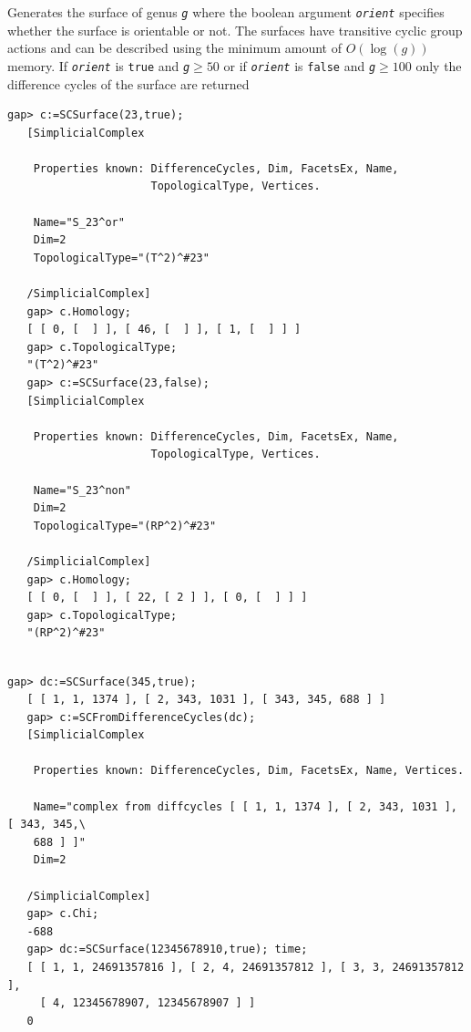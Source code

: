\documentclass[a4paper,11pt]{report}
\begin{document}
{{{ Generates the surface of genus \mbox{\texttt{\mdseries\slshape g}} where the boolean argument \mbox{\texttt{\mdseries\slshape orient}} specifies whether the surface is orientable or not. The surfaces have
transitive cyclic group actions and can be described using the minimum amount
of $O(\operatorname{log} (g))$ memory. If \mbox{\texttt{\mdseries\slshape orient}} is \texttt{true} and \mbox{\texttt{\mdseries\slshape g}}$ \geq 50$ or if \mbox{\texttt{\mdseries\slshape orient}} is \texttt{false} and \mbox{\texttt{\mdseries\slshape g}}$ \geq 100$ only the difference cycles of the surface are returned 
\begin{Verbatim}[commandchars=!@|,fontsize=\small,frame=single,label=Example]
   gap> c:=SCSurface(23,true); 
   [SimplicialComplex
   
    Properties known: DifferenceCycles, Dim, FacetsEx, Name, 
                      TopologicalType, Vertices.
   
    Name="S_23^or"
    Dim=2
    TopologicalType="(T^2)^#23"
   
   /SimplicialComplex]
   gap> c.Homology;
   [ [ 0, [  ] ], [ 46, [  ] ], [ 1, [  ] ] ]
   gap> c.TopologicalType;
   "(T^2)^#23"
   gap> c:=SCSurface(23,false); 
   [SimplicialComplex
   
    Properties known: DifferenceCycles, Dim, FacetsEx, Name, 
                      TopologicalType, Vertices.
   
    Name="S_23^non"
    Dim=2
    TopologicalType="(RP^2)^#23"
   
   /SimplicialComplex]
   gap> c.Homology;
   [ [ 0, [  ] ], [ 22, [ 2 ] ], [ 0, [  ] ] ]
   gap> c.TopologicalType;
   "(RP^2)^#23"
   
\end{Verbatim}
 
\begin{Verbatim}[commandchars=!@|,fontsize=\small,frame=single,label=Example]
   gap> dc:=SCSurface(345,true);
   [ [ 1, 1, 1374 ], [ 2, 343, 1031 ], [ 343, 345, 688 ] ]
   gap> c:=SCFromDifferenceCycles(dc);
   [SimplicialComplex
   
    Properties known: DifferenceCycles, Dim, FacetsEx, Name, Vertices.
   
    Name="complex from diffcycles [ [ 1, 1, 1374 ], [ 2, 343, 1031 ], [ 343, 345,\
    688 ] ]"
    Dim=2
   
   /SimplicialComplex]
   gap> c.Chi;
   -688
   gap> dc:=SCSurface(12345678910,true); time;
   [ [ 1, 1, 24691357816 ], [ 2, 4, 24691357812 ], [ 3, 3, 24691357812 ], 
     [ 4, 12345678907, 12345678907 ] ]
   0
   

\end{Verbatim}}}}
\end{document}
